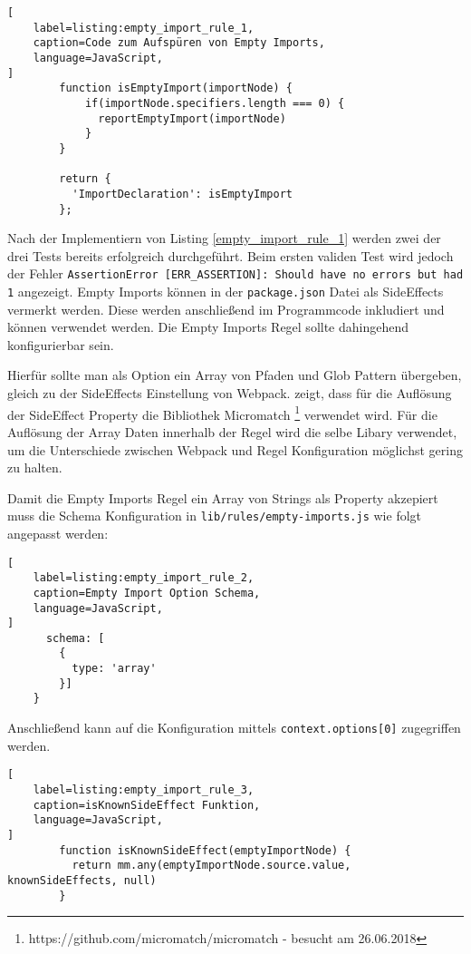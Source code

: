 \begin{lstlisting}[
    label=listing:empty_import_rule_1,
	caption=Code zum Aufspüren von Empty Imports,
	language=JavaScript,
]
        function isEmptyImport(importNode) {
            if(importNode.specifiers.length === 0) {
              reportEmptyImport(importNode)
            }
        }

        return {
          'ImportDeclaration': isEmptyImport
        };
\end{lstlisting}

Nach der Implementiern von Listing \ref{empty_import_rule_1} werden zwei der drei Tests bereits erfolgreich durchgeführt.  Beim ersten validen Test wird jedoch der Fehler \lstinline{AssertionError [ERR_ASSERTION]: Should have no errors but had 1} angezeigt. Empty Imports können in der \lstinline{package.json} Datei als SideEffects vermerkt werden. Diese werden anschließend im Programmcode inkludiert und können verwendet werden. Die Empty Imports Regel sollte dahingehend konfigurierbar sein.

Hierfür sollte man als Option ein Array von Pfaden und Glob Pattern übergeben, gleich zu der SideEffects Einstellung von Webpack. \textcite{WebpackTreeShaking} zeigt, dass für die Auflösung der SideEffect Property die Bibliothek Micromatch \footnote{https://github.com/micromatch/micromatch - besucht am 26.06.2018} verwendet wird. Für die Auflösung der Array Daten innerhalb der Regel wird die selbe Libary verwendet, um die Unterschiede zwischen Webpack und Regel Konfiguration möglichst gering zu halten.

Damit die Empty Imports Regel ein Array von Strings als Property akzepiert muss die Schema Konfiguration in \lstinline{lib/rules/empty-imports.js} wie folgt angepasst werden:

\begin{lstlisting}[
    label=listing:empty_import_rule_2,
	caption=Empty Import Option Schema,
	language=JavaScript,
]
      schema: [
        {
          type: 'array'
        }]
    }
\end{lstlisting}

Anschließend kann auf die Konfiguration mittels \lstinline{context.options[0]} zugegriffen werden.

\begin{lstlisting}[
    label=listing:empty_import_rule_3,
	caption=isKnownSideEffect Funktion,
	language=JavaScript,
]
        function isKnownSideEffect(emptyImportNode) {
          return mm.any(emptyImportNode.source.value, knownSideEffects, null)
        }
\end{lstlisting}

